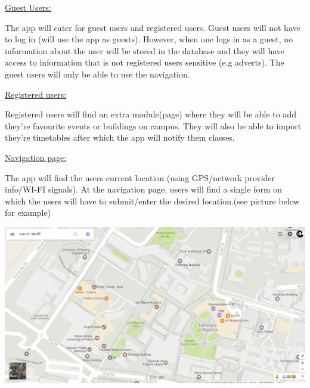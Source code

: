 \documentclass[12pt]{article}
\begin{document}
{\raggedright

\uline{Guest Users:}}



{\raggedright

The app will cater for guest users and registered users. Guest users will not have to log in (will use the app as guests). However, when one logs in as a guest, no information about the user will be stored in the database and they will have access to information that is not registered users sensitive (e.g adverts). The guest users will only be able to use the navigation.

}



{\raggedright



}



{\raggedleft

\uline{Registered users:}}



{\raggedright

Registered users will find an extra module(page) where they will be able to add they're favourite events or buildings on campus. They will also be able to import they're timetables after which the app will notify them classes.

}



{\raggedright

\uline{Navigation page:}}



The app will find the users current location (using GPS/network provider info/WI-FI signals). At the navigation page, users will find a single form on which the users will have to submit/enter the desired location.(see picture below for example)



\includegraphics{1.png}
\end{document}
